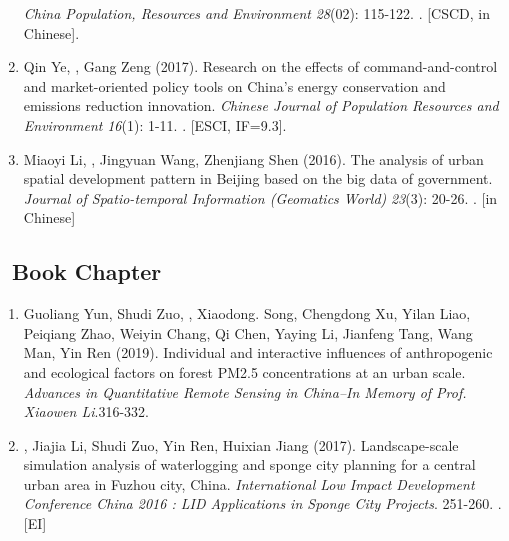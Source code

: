 \begin{enumerate}
    \textit{China Population, Resources and Environment} \textit{28}(02): 115-122.
    . [CSCD, in Chinese].
\item
    Qin Ye, \Shaoqing, Gang Zeng (2017).
	Research on the effects of command-and-control and market-oriented policy tools on China’s energy conservation and emissions reduction innovation.
    \textit{Chinese Journal of Population Resources and Environment} \textit{16}(1): 1-11.
    . [ESCI, IF=9.3].
\item
    Miaoyi Li, \Shaoqing, Jingyuan Wang, Zhenjiang Shen (2016).
	The analysis of urban spatial development pattern in Beijing based on the big data of government.
    \textit{Journal of Spatio-temporal Information (Geomatics World)} \textit{23}(3): 20-26.
    . [in Chinese]
\end{enumerate}

\subsection*{\texorpdfstring{\faBook\ Book Chapter}{Book Chapter}}
\begin{enumerate}
\item
    Guoliang Yun, Shudi Zuo, \Shaoqing, Xiaodong. Song, Chengdong Xu, Yilan Liao, Peiqiang Zhao, Weiyin Chang, Qi Chen, Yaying Li, Jianfeng Tang, Wang Man, Yin Ren (2019).
	Individual and interactive influences of anthropogenic and ecological factors on forest PM2.5 concentrations at an urban scale.
    \textit{Advances in Quantitative Remote Sensing in China–In Memory of Prof. Xiaowen Li}.316-332.
\item
    \Shaoqing, Jiajia Li, Shudi Zuo, Yin Ren, Huixian Jiang (2017).
	Landscape-scale simulation analysis of waterlogging and sponge city planning for a central urban area in Fuzhou city, China.
    \textit{International Low Impact Development Conference China 2016 : LID Applications in Sponge City Projects}. 251-260.
    . [EI]
\end{enumerate}

